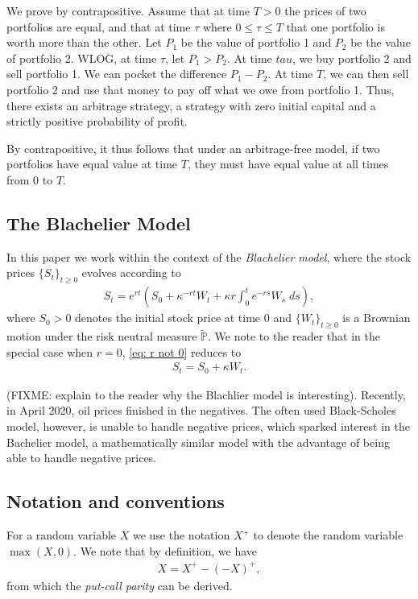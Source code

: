 \documentclass[reqno]{amsart}
\begin{document}
We prove by contrapositive. Assume that at time $T > 0$ the prices of two portfolios are equal, and that at time $\tau$ where $0 \leq \tau \leq T$ that one portfolio is worth more than the other. 
Let $P_1$ be the value of portfolio 1 and $P_2$ be the value of portfolio 2. WLOG, at time $\tau$, let $P_1 > P_2$.
At time $tau$, we buy portfolio 2 and sell portfolio 1. We can pocket the difference $P_1 - P_2$. At time $T$, we can then sell portfolio 2 and use that money to pay off what we owe from portfolio 1. 
Thus, there exists an arbitrage strategy, a strategy with zero initial capital and a strictly positive probability of profit.

By contrapositive, it thus follows that under an arbitrage-free model, if two portfolios have equal value at time $T$, they must have equal value at all times from $0$ to $T$.

\subsection{The Blachelier Model}
In this paper we work within the context of the \emph{Blachelier model}, where the stock prices $\{S_t\}_{t \ge 0}$ evolves according to 
\begin{align}\label{eq: r not 0}
	 S_t = e^{rt} \left( S_0 + \kappa^{-rt}W_t + \kappa r \int_0^t e^{-rs} W_s \; ds \right),
\end{align}
where $S_0 > 0$ denotes the initial stock price at time 0 and $\{W_t\}_{t \ge 0}$ is a Brownian motion under the risk neutral measure $\tilde{\mathbb{P}}$. We note to the reader that in the special case when $r = 0$, \eqref{eq: r not 0} reduces to 
\begin{align}\label{eq: r=0}
      S_t = S_0 + \kappa W_t. 
\end{align}

(FIXME: explain to the reader why the Blachlier model is interesting).
Recently, in April 2020, oil prices finished in the negatives. The often used Black-Scholes model, however, is unable to handle negative prices, which sparked interest in the Bachelier model, a mathematically similar model with the advantage of being able to handle negative prices.


\subsection{Notation and conventions}

For a random variable $X$ we use the notation $X^+$ to denote the random variable $\max(X,0)$. We note that by definition, we have 
\begin{align}\label{eq: pos part decomp}
      X = X^+ - (-X)^+,
\end{align}
from which the \emph{put-call parity} can be derived. 
\end{document}
